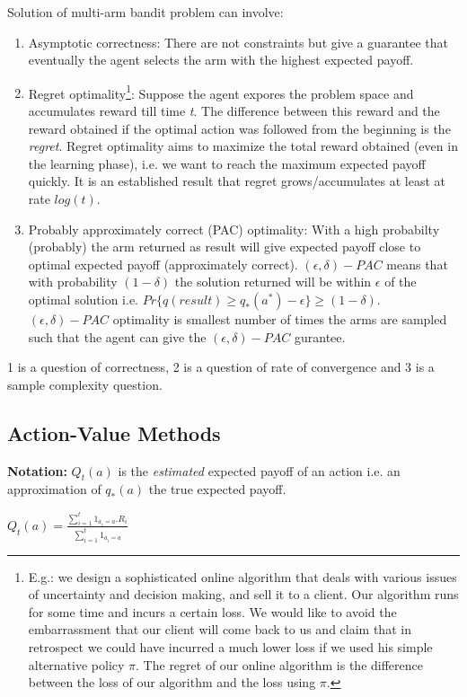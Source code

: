 \documentclass[a4paper]{article}
\begin{document}
Solution of multi-arm bandit problem can involve:
\begin{enumerate}
\item Asymptotic correctness: There are not constraints but give a guarantee that eventually the agent selects the arm with the highest expected payoff.
\item Regret optimality\footnote{ E.g.: we design a sophisticated online algorithm that deals with various issues of uncertainty and decision making, and sell it to a client. Our algorithm runs for some time and incurs a certain loss. We would like to avoid the embarrassment that our client will come back to us and claim that in retrospect we could have incurred a much lower loss if we used his simple alternative policy $\pi$. The regret of our online algorithm is the difference between the loss of our algorithm and the loss using $\pi$.}: Suppose the agent expores the problem space and accumulates reward till time \textit{t}. The difference between this reward and the reward obtained if the optimal action was followed from the beginning is the \textit{regret}. Regret optimality aims to maximize the total reward obtained (even in the learning phase), i.e. we want to reach the maximum expected payoff quickly. It is an established result that regret grows/accumulates at least at rate $log(t)$.
\item Probably approximately correct (PAC) optimality: With a high probabilty (probably) the arm returned as result will give expected payoff close to optimal expected payoff (approximately correct). $(\epsilon, \delta)-PAC$ means that with probability $(1-\delta)$ the solution returned will be within $\epsilon$ of the optimal solution i.e. $Pr\{q(result) \geq q_{*}(a^*) - \epsilon\} \geq (1-\delta)$. $(\epsilon, \delta)-PAC$ optimality is smallest number of times the arms are sampled such that the agent can give the $(\epsilon, \delta)-PAC$ gurantee.
\end{enumerate}

1 is a question of correctness, 2 is a question of rate of convergence and 3 is a sample complexity question.

\subsection{Action-Value Methods}
\textbf{Notation:} $Q_t(a)$ is the \textit{estimated} expected payoff of an action i.e. an approximation of $q_*(a)$ the true expected payoff.

$Q_t(a) = \frac{\sum_{i=1}^t 1_{a_i=a}.R_i}{\sum_{i=1}^t 1_{a_i=a}}$
\end{document}
